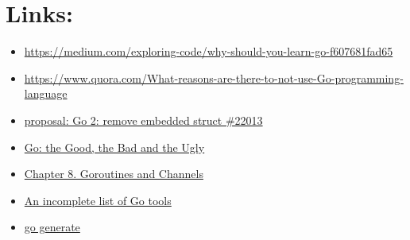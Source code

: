 \documentclass[11pt]{article}
\begin{document}
\section*{Links:}
\label{sec:orgheadline25}
\begin{itemize}
\item \url{https://medium.com/exploring-code/why-should-you-learn-go-f607681fad65}
\item \url{https://www.quora.com/What-reasons-are-there-to-not-use-Go-programming-language}
\item \href{https://github.com/golang/go/issues/22013}{proposal: Go 2: remove embedded struct \#22013}
\item \href{https://bluxte.net/musings/2018/04/10/go-good-bad-ugly/#a-few-days-later-3-on-hacker-news}{Go: the Good, the Bad and the Ugly}
\item \href{https://notes.shichao.io/gopl/ch8/}{Chapter 8. Goroutines and Channels}
\item \href{https://dominik.honnef.co/posts/2014/12/an_incomplete_list_of_go_tools/}{An incomplete list of Go tools}
\item \href{https://blog.carlmjohnson.net/post/2016-11-27-how-to-use-go-generate/}{go generate}
\end{itemize}
\end{document}

